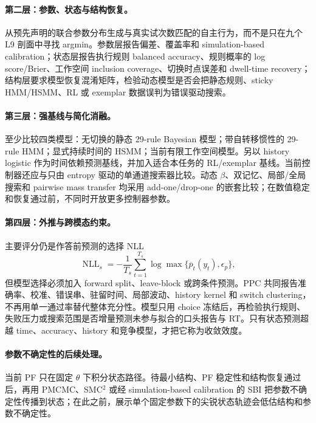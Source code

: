 \paragraph{第二层：参数、状态与结构恢复。}
从预先声明的联合参数分布生成与真实试次数匹配的自主行为，而不是只在九个 L9 剖面中寻找 argmin。参数层报告偏差、覆盖率和 simulation-based calibration；状态层报告执行规则 balanced accuracy、规则概率的 log score/Brier、工作空间 inclusion coverage、切换时点误差和 dwell-time recovery；结构层要求模型恢复混淆矩阵，检验动态模型是否会把静态规则、sticky HMM/HSMM、RL 或 exemplar 数据误判为错误驱动搜索。

\paragraph{第三层：强基线与简化消融。}
至少比较四类模型：无切换的静态 29-rule Bayesian 模型；带自转移惯性的 29-rule HMM；显式持续时间的 HSMM；当前有限工作空间模型。另以 history logistic 作为时间依赖预测基线，并加入适合本任务的 RL/exemplar 基线。当前控制器还应与只由 entropy 驱动的单通道搜索器比较。动态 $\beta$、双记忆、局部/全局搜索和 pairwise mass transfer 均采用 add-one/drop-one 的嵌套比较；在数值稳定和恢复通过前，不同时开放更多控制器参数。

\paragraph{第四层：外推与跨模态约束。}
主要评分仍是作答前预测的选择 NLL
\begin{equation}
\operatorname{NLL}_s
=-\frac{1}{T_s}\sum_{t=1}^{T_s}
\log\max\{\overline p_t(y_t),\epsilon_p\},
\label{eq:dynamic-nll}
\end{equation}
但模型选择必须加入 forward split、leave-block 或跨条件预测。PPC 共同报告准确率、校准、错误串、驻留时间、局部波动、history kernel 和 switch clustering，不再用单一通过率替代整体充分性。模型只用 choice 冻结后，再检验执行规则、失败压力或搜索范围是否增量预测未参与拟合的口头报告与 RT。只有状态预测超越 time、accuracy、history 和竞争模型，才把它称为收敛效度。

\paragraph{参数不确定性的后续处理。}
当前 PF 只在固定 $\theta$ 下积分状态路径。待最小结构、PF 稳定性和结构恢复通过后，再用 PMCMC、SMC$^2$ 或经 simulation-based calibration 的 SBI 把参数不确定性传播到状态；在此之前，展示单个固定参数下的尖锐状态轨迹会低估结构和参数不确定性。


